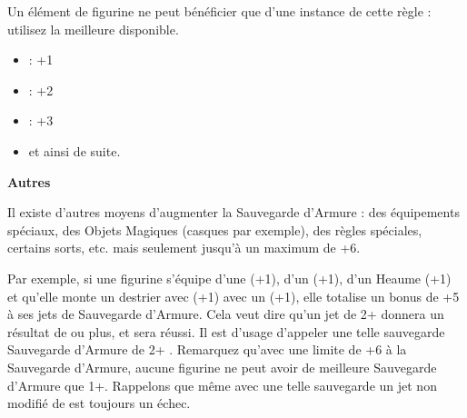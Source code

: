 \begin{multicols}{2}
Un élément de figurine ne peut bénéficier que d'une instance de cette règle : utilisez la meilleure disponible.

\noindent\begin{itemize}[label={-}, topsep=0cm, itemsep=0pt]
\item {} : +1
\item {} : +2
\item {} : +3
\item et ainsi de suite.
\end{itemize}

\end{multicols}

\noindent\textbf{Autres}

Il existe d'autres moyens d'augmenter la Sauvegarde d'Armure : des équipements spéciaux, des Objets Magiques (casques par exemple), des règles spéciales, certains sorts, etc. mais seulement jusqu'à un maximum de +6.

Par exemple, si une figurine s'équipe d'une \la{} (+1), d'un \shield{} (+1), d'un Heaume (+1) et qu'elle monte un destrier avec  (+1) avec un \barding{} (+1), elle totalise un bonus de +5 à ses jets de Sauvegarde d'Armure. Cela veut dire qu'un jet de 2+ donnera un résultat de  ou plus, et sera réussi. Il est d'usage d'appeler une telle sauvegarde \og Sauvegarde d'Armure de 2+ \fg{}. Remarquez qu'avec une limite de +6 à la Sauvegarde d'Armure, aucune figurine ne peut avoir de meilleure Sauvegarde d'Armure que 1+. Rappelons que même avec une telle sauvegarde un jet non modifié de  est toujours un échec.
